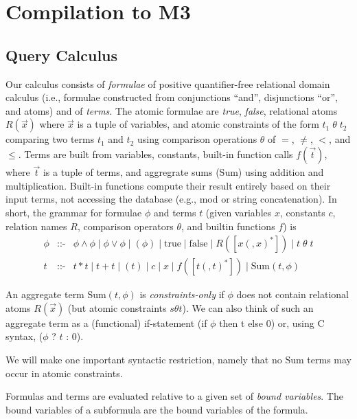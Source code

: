 

\section{Compilation to M3}
\label{sec:compiler}


\subsection{Query Calculus}


\def\safe{\mbox{safe}}
\def\AggSum{\mbox{Sum}}

Our calculus consists of
{\em formulae} of positive quantifier-free relational domain calculus
(i.e., formulae constructed from conjunctions ``and'',
disjunctions ``or'', and atoms) and of {\em terms}.
%
The atomic formulae are {\em true}, {\em false}, relational atoms $R(\vec{x})$
where $\vec{x}$ is a tuple of variables,
and atomic constraints of the form $t_1 \;\theta\; t_2$ comparing two terms
$t_1$ and $t_2$ using comparison operations $\theta$ of $=$, $\neq$, $<$,
and $\leq$.
%
Terms are built from variables, constants, built-in function calls
$f(\vec{t})$, where $\vec{t}$ is a tuple of terms,
and aggregrate sums ($\AggSum$) using addition and multiplication.
Built-in functions compute their result entirely based on their input
terms, not accessing the database (e.g., mod or string concatenation).
In short, the grammar for formulae $\phi$ and terms $t$
(given variables $x$, constants $c$, relation names $R$,
comparison operators $\theta$,
and builtin functions $f$) is
\begin{eqnarray*}
  \phi &\mbox{::-}& \phi \land \phi
               \mid \phi \lor \phi \mid (\phi)
               \mid \mbox{true} \mid \mbox{false} \mid R([x(,x)^*])
               \mid t \;\theta\; t
\\
  t &\mbox{::-}& t * t \mid t + t \mid (t) \mid c \mid x \mid f([t(,t)^*]) \mid
                 \AggSum(t, \phi)
\end{eqnarray*}

An aggregate term $\AggSum(t, \phi)$
is {\em constraints-only} if $\phi$ does not
contain relational atoms $R(\vec{x})$ (but atomic constraints $s \theta t$).
We can also think of such an aggregate term as a (functional)
if-statement (if $\phi$ then t else 0)
or, using C syntax, ($\phi$ ? $t$ : 0).

We will make one important syntactic restriction, namely that
no $\AggSum$ terms may occur in atomic constraints.

Formulas and terms are evaluated relative to a given set of
{\em bound variables}.
The bound variables of a subformula are the bound variables of the formula.

